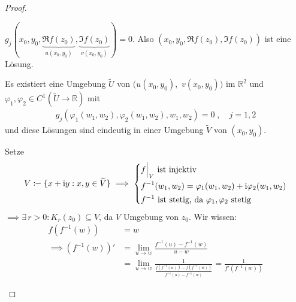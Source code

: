 \documentclass[a4paper,10pt]{scrbook}
\begin{document}
\begin{theorem}
\begin{proof}
\begin{enum-arab}
      \item $g_j(x_0,y_0,\underbrace{\Re f(z_0)}_{u(x_0,y_0)},\underbrace{\Im f(z_0)}_{v(x_0,y_0)}) = 0$. Also $(x_0,y_0,\Re f(z_0),\Im f(z_0))$ ist eine Lösung.
      \begin{theorem*}
        Es existiert eine Umgebung $\widetilde{U}$ von $(u(x_0,y_0),$ $v(x_0,y_0))$ %
        im $\mathbb{R}^2$ und $\varphi_1,\varphi_2 \in C^1(\widetilde{U} \to \mathbb{R})$ mit
        \begin{align*}
          g_j(\varphi_1(w_1,w_2),\varphi_2(w_1,w_2),w_1,w_2) = 0 \; , \quad j=1,2
        \end{align*}
        und diese Lösungen sind eindeutig in einer Umgebung $\widetilde{V}$ von $(x_0,y_0)$.
      \end{theorem*}
      Setze
      \begin{align*}
        V \coloneq \{ x+\mathrm{i}y : x,y \in \widetilde{V} \}
        \implies
        \begin{dcases}
          f \Big|_{V} \text{ ist injektiv} \\
          f^{-1}(w_1,w_2) = \varphi_1(w_1,w_2) + \mathrm{i} \varphi_2(w_1,w_2) \\
          f^{-1} \text{ ist stetig, da } \varphi_1, \varphi_2 \text{ stetig}
        \end{dcases}
      \end{align*}
      $\implies \exists \, r > 0 : K_r(z_0) \subseteq V$, da $V$ Umgebung von $z_0$. Wir wissen:
      \begin{align*}
        f(f^{-1}(w)) &= w \\
        \implies
        (f^{-1}(w))' &= \lim\limits_{u \to w} \frac{f^{-1}(u) - f^{-1}(w)}{u - w} \\
        &= \lim\limits_{u \to w} \frac{1}{\frac{f(f^{-1}(u)) - f(f^{-1}(w))}{f^{-1}(u) - f^{-1}(w)}} = \frac{1}{f'(f^{-1}(w))}
      \end{align*}
    \end{enum-arab}
  \end{proof}
\end{theorem}
\end{document}

